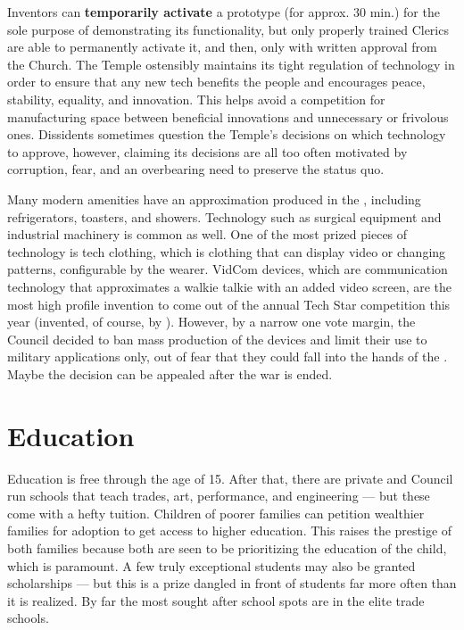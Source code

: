 \documentclass[blue]{GL2020}
\begin{document}
Inventors can \textbf{temporarily activate} a prototype (for approx. 30 min.) for the sole purpose of demonstrating its functionality, but only properly trained Clerics are able to permanently activate it, and then, only with written approval from the Church. The Temple ostensibly maintains its tight regulation of technology in order to ensure that any new tech benefits the people and encourages peace, stability, equality, and innovation. This helps avoid a competition for manufacturing space between beneficial innovations and unnecessary or frivolous ones.  Dissidents sometimes question the Temple's decisions on which technology to approve, however, claiming its decisions are all too often motivated by corruption, fear, and an overbearing need to preserve the status quo.

Many modern amenities have an approximation produced in the \pTech{}, including refrigerators, toasters, and showers. Technology such as surgical equipment and industrial machinery is common as well. One of the most prized pieces of technology is tech clothing, which is clothing that can display video or changing patterns, configurable by the wearer. VidCom devices, which are communication technology that approximates a walkie talkie with an added video screen, are the most high profile invention to come out of the annual Tech Star competition this year (invented, of course, by \cTechStar{\full}). However, by a narrow one vote margin, the Council decided to ban mass production of the devices and limit their use to military applications only, out of fear that they could fall into the hands of the \pShippies{}. Maybe the decision can be appealed after the war is ended.
    
\section*{Education}
Education is free through the age of 15. After that, there are private and Council run schools that teach trades, art, performance, and engineering — but these come with a hefty tuition. Children of poorer families can petition wealthier families for adoption to get access to higher education. This raises the prestige of both families because both are seen to be prioritizing the education of the child, which is paramount.  A few truly exceptional students may also be granted scholarships — but this is a prize dangled in front of students far more often than it is realized. By far the most sought after school spots are in the elite trade schools.
\end{document}
